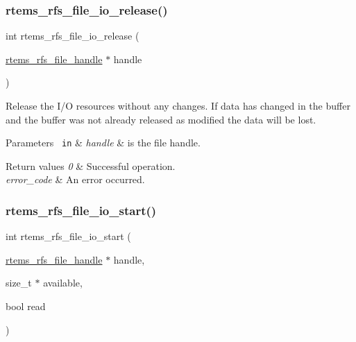 \subsubsection{\texorpdfstring{rtems\_rfs\_file\_io\_release()}{rtems\_rfs\_file\_io\_release()}}
{\footnotesize\ttfamily int rtems\+\_\+rfs\+\_\+file\+\_\+io\+\_\+release (\begin{DoxyParamCaption}\item[{\mbox{\hyperlink{rtems-rfs-file_8h_a35a0f4ad45bd35ea0af7df0aa0ad893b}{rtems\+\_\+rfs\+\_\+file\+\_\+handle}} $\ast$}]{handle }\end{DoxyParamCaption})}

Release the I/O resources without any changes. If data has changed in the buffer and the buffer was not already released as modified the data will be lost.


\begin{DoxyParams}[1]{Parameters}
\mbox{\texttt{ in}}  & {\em handle} & is the file handle.\\
\hline
\end{DoxyParams}

\begin{DoxyRetVals}{Return values}
{\em 0} & Successful operation. \\
\hline
{\em error\+\_\+code} & An error occurred. \\
\hline
\end{DoxyRetVals}
\mbox{\label{rtems-rfs-file_8c_a95a9fbf77d3ac355c21ac263db639439}} 
\subsubsection{\texorpdfstring{rtems\_rfs\_file\_io\_start()}{rtems\_rfs\_file\_io\_start()}}
{\footnotesize\ttfamily int rtems\+\_\+rfs\+\_\+file\+\_\+io\+\_\+start (\begin{DoxyParamCaption}\item[{\mbox{\hyperlink{rtems-rfs-file_8h_a35a0f4ad45bd35ea0af7df0aa0ad893b}{rtems\+\_\+rfs\+\_\+file\+\_\+handle}} $\ast$}]{handle,  }\item[{size\+\_\+t $\ast$}]{available,  }\item[{bool}]{read }\end{DoxyParamCaption})}

